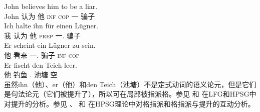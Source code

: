 \eal
\ex 
\gll John believes him to be a liar.\\
	 John 认为 他 \textsc{inf} \textsc{cop} 一 骗子\\
\ex 
\gll Ich halte ihn für einen Lügner.\\
	我 认为 他 \textsc{prep} 一.\acc{} 骗子\\
\ex 
\gll Er scheint ein Lügner zu sein.\\
	 他 看来 一.\nom{} 骗子 \textsc{inf} \textsc{cop}\\
\ex 
\gll Er fischt den Teich leer.\\
	 他 钓鱼 .\acc{} 池塘 空\\
\zl
虽然ihn（他）、er（他）和den Teich（池塘）不是定式动词的语义论元，但是它们是句法论元（它们被提升了），所以可在局部被指派格。参见 和 在LFG\indexlfg 和HPSG\indexhpsg 中对提升的分析。参见 、 和 在HPSG理论中对格指派和格指派与提升的互动分析。

